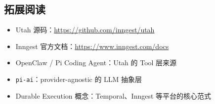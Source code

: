 \subsection{拓展阅读}

\begin{itemize}
    \item Utah 源码：\url{https://github.com/inngest/utah}
    \item Inngest 官方文档：\url{https://www.inngest.com/docs}
    \item OpenClaw / Pi Coding Agent：Utah 的 Tool 层来源
    \item \texttt{pi-ai}：provider-agnostic 的 LLM 抽象层
    \item Durable Execution 概念：Temporal、Inngest 等平台的核心范式
\end{itemize}



